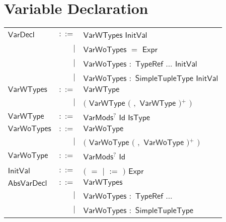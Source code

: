  \hfill 

\section{Variable Declaration} 

 
\begin{longtable}[l]{p{3cm}rl}
$\mathsf{VarDecl}$ &  $\mathsf{::=}$  & $\mathsf{VarWTypes}$ $\mathsf{InitVal}$ \\
 & $\big|$ &  $\mathsf{VarWoTypes}$ $\mathbf{=}$ $\mathsf{Expr}$ \\
 & $\big|$ &  $\mathsf{VarWoTypes}$ $\mathbf{:}$ $\mathsf{TypeRef}$ $\mathbf{...}$ $\mathsf{InitVal}$ \\
 & $\big|$ &  $\mathsf{VarWoTypes}$ $\mathbf{:}$ $\mathsf{SimpleTupleType}$ $\mathsf{InitVal}$ \\
$\mathsf{VarWTypes}$ &  $\mathsf{::=}$  & $\mathsf{VarWType}$ \\
 & $\big|$ &  $\big($  $\mathsf{VarWType}$ $\big($  $\mathbf{,}$ $\mathsf{VarWType}$ $\big)$$^+$ $\big)$ \\
$\mathsf{VarWType}$ &  $\mathsf{::=}$  & $\mathsf{VarMods}$$^?$ $\mathsf{Id}$ $\mathsf{IsType}$ \\
$\mathsf{VarWoTypes}$ &  $\mathsf{::=}$  & $\mathsf{VarWoType}$ \\
 & $\big|$ &  $\big($  $\mathsf{VarWoType}$ $\big($  $\mathbf{,}$ $\mathsf{VarWoType}$ $\big)$$^+$ $\big)$ \\
$\mathsf{VarWoType}$ &  $\mathsf{::=}$  & $\mathsf{VarMods}$$^?$ $\mathsf{Id}$ \\
$\mathsf{InitVal}$ &  $\mathsf{::=}$  & $\big($  $\mathbf{=}$ $\big|$ $\mathbf{:=}$ $\big)$ $\mathsf{Expr}$ \\
$\mathsf{AbsVarDecl}$ &  $\mathsf{::=}$  & $\mathsf{VarWTypes}$ \\
 & $\big|$ &  $\mathsf{VarWoTypes}$ $\mathbf{:}$ $\mathsf{TypeRef}$ $\mathbf{...}$ \\
 & $\big|$ &  $\mathsf{VarWoTypes}$ $\mathbf{:}$ $\mathsf{SimpleTupleType}$ \\
\end{longtable} \hfill 

